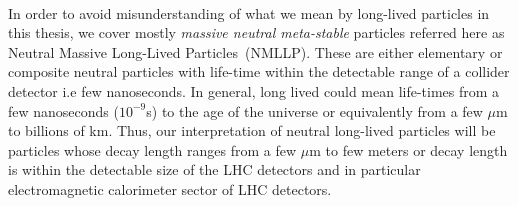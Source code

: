 \paragraph*{}
In order to avoid misunderstanding of what we mean by long-lived particles in this thesis, we cover mostly \textit{massive neutral meta-stable} particles  referred here as \textsf{Neutral Massive Long-Lived Particles}~(NMLLP). These are either elementary or composite neutral particles with life-time within the detectable range of a collider detector i.e few nanoseconds. In general, 
long lived could mean life-times from a few nanoseconds ($10^{-9}$s) to the age of the universe or equivalently from a few  $\mu$m to billions of km.
Thus, our interpretation of neutral long-lived particles will be particles whose decay length ranges from a few $\mu$m to few meters or decay length is within the detectable size of the LHC detectors and in particular electromagnetic calorimeter sector of LHC detectors.



